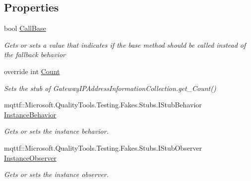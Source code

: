 \subsection*{Properties}
\begin{DoxyCompactItemize}
\item 
bool \hyperlink{class_system_1_1_net_1_1_network_information_1_1_fakes_1_1_stub_gateway_i_p_address_information_collection_aa13e361113aad14186c593b5c6a07107}{Call\-Base}
\begin{DoxyCompactList}\small\item\em Gets or sets a value that indicates if the base method should be called instead of the fallback behavior\end{DoxyCompactList}\item 
override int \hyperlink{class_system_1_1_net_1_1_network_information_1_1_fakes_1_1_stub_gateway_i_p_address_information_collection_afcd2cb4b2c65504719546123ab4c689e}{Count}
\begin{DoxyCompactList}\small\item\em Sets the stub of Gateway\-I\-P\-Address\-Information\-Collection.\-get\-\_\-\-Count()\end{DoxyCompactList}\item 
mqttf\-::\-Microsoft.\-Quality\-Tools.\-Testing.\-Fakes.\-Stubs.\-I\-Stub\-Behavior \hyperlink{class_system_1_1_net_1_1_network_information_1_1_fakes_1_1_stub_gateway_i_p_address_information_collection_afc6ade5cf20e30d63ed8ab394549bb8c}{Instance\-Behavior}
\begin{DoxyCompactList}\small\item\em Gets or sets the instance behavior.\end{DoxyCompactList}\item 
mqttf\-::\-Microsoft.\-Quality\-Tools.\-Testing.\-Fakes.\-Stubs.\-I\-Stub\-Observer \hyperlink{class_system_1_1_net_1_1_network_information_1_1_fakes_1_1_stub_gateway_i_p_address_information_collection_a74a95a523176032e9513b17db8165103}{Instance\-Observer}
\begin{DoxyCompactList}\small\item\em Gets or sets the instance observer.\end{DoxyCompactList}\item 

\end{DoxyCompactItemize}
